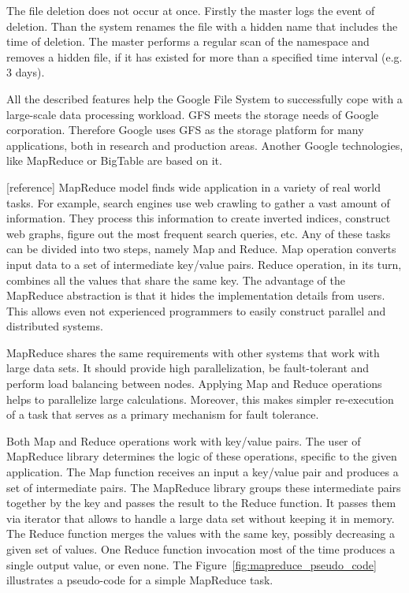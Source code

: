 The file deletion does not occur at once.
Firstly the master logs the event of deletion.
Than the system renames the file with a hidden name that includes the time of deletion.
The master performs a regular scan of the namespace and removes a hidden file, if it has existed for more than a specified time interval (e.g. 3 days). 

All the described features help the Google File System to successfully cope with a large-scale data processing workload.
GFS meets the storage needs of Google corporation.
Therefore Google uses GFS as the storage platform for many applications, both in research and production areas.
Another Google technologies, like MapReduce or BigTable are based on it.  	 

[reference]
MapReduce model finds wide application in a variety of real world tasks.
For example, search engines use web crawling to gather a vast amount of information.
They process this information to create inverted indices, construct web graphs, figure out the most frequent search queries, etc.
Any of these tasks can be divided into two steps, namely Map and Reduce.
Map operation converts input data to a set of intermediate key/value pairs.
Reduce operation, in its turn, combines all the values that share the same key.
The advantage of the MapReduce abstraction is that it hides the implementation details from users.
This allows even not experienced programmers to easily construct parallel and distributed systems.

MapReduce shares the same requirements with other systems that work with large data sets.
It should provide high parallelization, be fault-tolerant and perform load balancing between nodes.
Applying Map and Reduce operations helps to parallelize large calculations.
Moreover, this makes simpler re-execution of a task that serves as a primary mechanism for fault tolerance.

Both Map and Reduce operations work with key/value pairs.
The user of MapReduce library determines the logic of these operations, specific to the given application.
The Map function receives an input a key/value pair and produces a set of intermediate pairs.
The MapReduce library groups these intermediate pairs together by the key and passes the result to the Reduce function.
It passes them via iterator that allows to handle a large data set without keeping it in memory.
The Reduce function merges the values with the same key, possibly decreasing a given set of values.
One Reduce function invocation most of the time produces a single output value, or even none.
The Figure~\ref{fig:mapreduce_pseudo_code} illustrates a pseudo-code for a simple
MapReduce task.


